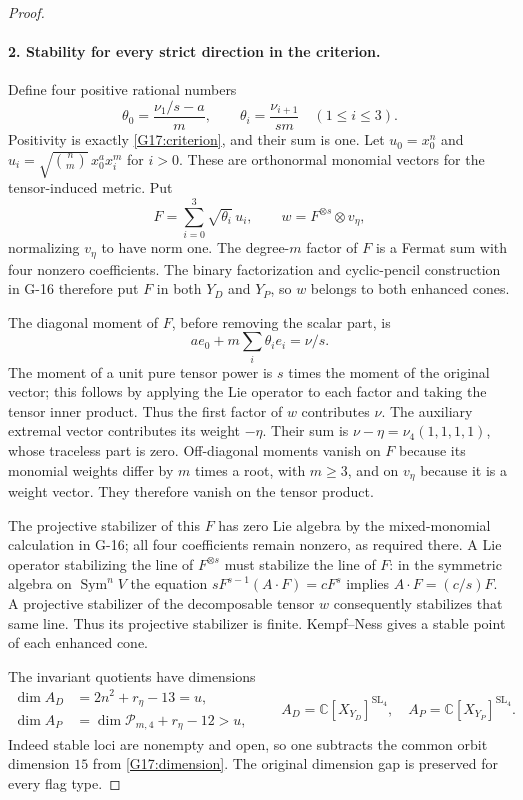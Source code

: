 \begin{proof}
\paragraph{2. Stability for every strict direction in the criterion.}
Define four positive rational numbers
\[
 \theta_0=\frac{\nu_1/s-a}{m},\qquad
 \theta_i=\frac{\nu_{i+1}}{sm}\quad(1\leq i\leq3).
\]
Positivity is exactly \eqref{G17:criterion}, and their sum is one.
Let $u_0=x_0^n$ and
$u_i=\sqrt{\binom nm}\,x_0^a x_i^m$ for $i>0$.
These are orthonormal monomial vectors for the tensor-induced metric.
Put
\[
 F=\sum_{i=0}^3\sqrt{\theta_i}\,u_i,
 \qquad w=F^{\otimes s}\otimes v_\eta,
\]
normalizing $v_\eta$ to have norm one. The degree-$m$ factor of $F$
is a Fermat sum with four nonzero coefficients. The binary factorization
and cyclic-pencil construction in G-16 therefore put $F$ in both
$Y_D$ and $Y_P$, so $w$ belongs to both enhanced cones.

The diagonal moment of $F$, before removing the scalar part, is
\[
 a e_0+m\sum_i\theta_i e_i=\nu/s.
\]
The moment of a unit pure tensor power is $s$ times the moment of
the original vector; this follows by applying the Lie operator to
each factor and taking the tensor inner product. Thus the first
factor of $w$ contributes $\nu$. The auxiliary extremal vector
contributes its weight $-\eta$. Their sum is
$\nu-\eta=\nu_4(1,1,1,1)$, whose traceless part is zero.
Off-diagonal moments vanish on $F$ because its monomial weights
differ by $m$ times a root, with $m\geq3$, and on $v_\eta$ because
it is a weight vector. They therefore vanish on the tensor product.

The projective stabilizer of this $F$ has zero Lie algebra by the
mixed-monomial calculation in G-16; all four coefficients remain
nonzero, as required there. A Lie operator stabilizing the line of
$F^{\otimes s}$ must stabilize the line of $F$: in the symmetric
algebra on $\operatorname{Sym}^n V$ the equation
$sF^{s-1}(A\cdot F)=cF^s$ implies $A\cdot F=(c/s)F$.
A projective stabilizer of the decomposable tensor $w$ consequently
stabilizes that same line. Thus its projective stabilizer is finite.
Kempf--Ness gives a stable point of each enhanced cone.

The invariant quotients have dimensions
\begin{equation}\label{G17:quotdims}
 \begin{split}
 \dim A_D&=2n^2+r_\eta-13=u,\\
 \dim A_P&=\dim\mathcal P_{m,4}+r_\eta-12>u,
 \end{split}
 \qquad A_D=\mathbb C[X_{Y_D}]^{\mathrm{SL}_4},\quad
 A_P=\mathbb C[X_{Y_P}]^{\mathrm{SL}_4}.
\end{equation}
Indeed stable loci are nonempty and open, so one subtracts the
common orbit dimension $15$ from \eqref{G17:dimension}.
The original dimension gap is preserved for every flag type.


\end{proof}

